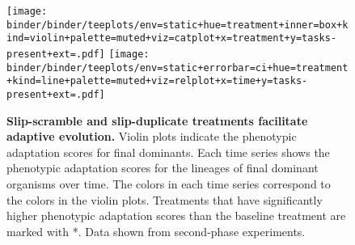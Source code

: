 \begin{figure}[!h]
  \texttt{[image: binder/binder/teeplots/env=static+hue=treatment+inner=box+kind=violin+palette=muted+viz=catplot+x=treatment+y=tasks-present+ext=.pdf]}%
   \texttt{[image: binder/binder/teeplots/env=static+errorbar=ci+hue=treatment+kind=line+palette=muted+viz=relplot+x=time+y=tasks-present+ext=.pdf]}

   \vspace{-2ex}

  \caption{\textbf{Slip-scramble and slip-duplicate treatments facilitate adaptive evolution.}
  \small Violin plots indicate the phenotypic adaptation scores for final dominants.
  Each time series shows the phenotypic adaptation scores for the lineages of final dominant organisms over time. The colors in each time series correspond to the colors in the violin plots.
  Treatments that have significantly higher phenotypic adaptation scores than the baseline treatment are marked with *.
  Data shown from second-phase experiments.
}
  \label{fig:results_panels}
\end{figure}
